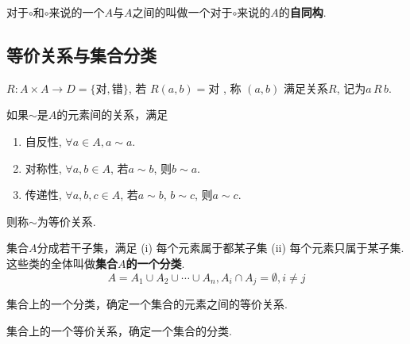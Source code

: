 \begin{Definition}[自同构]
对于$\circ$和$\circ$来说的一个$A$与$A$之间的\;\;叫做一个对于$\circ$来说的$A$的\textbf{自同构}.
\end{Definition}

\subsection{等价关系与集合分类}

\begin{Definition}[关系\mbox{[Relation]}]
$R: A \times A \rightarrow D = \{\text{对}, \text{错}\} $, 
若
$R(a, b) = \text{对}$
, 称
$(a, b)$
满足关系$R$, 记为$a \, R \, b$.
\end{Definition}

\begin{Definition}[等价关系]
如果$\sim$是$A$的元素间的关系，满足 
\begin{enumerate}[(1)]
\item 自反性, $\forall a \in A, a \sim a$.
\item 对称性, $\forall a, b \in A$, 若$a \sim b$, 则$b \sim a$.
\item 传递性, $\forall a, b, c \in A$, 若$a \sim b$, $b\sim c$, 则$a \sim c$.
\end{enumerate}
则称$\sim$为等价关系.
\end{Definition}

\begin{Definition}[集合分类、划分]
集合$A$分成若干子集，满足 (i) 每个元素属于都某子集 (ii) 每个元素只属于某子集. 这些类的全体叫做\textbf{集合$A$的一个分类}.
$$ A = A_1 \cup A_2 \cup \cdots \cup A_n, A_i \cap A_j = \emptyset, i \neq j$$
\end{Definition}

\begin{Theorem}
集合上的一个分类，确定一个集合的元素之间的等价关系.
\end{Theorem}

\begin{Theorem}
集合上的一个等价关系，确定一个集合的分类.
\end{Theorem}

\begin{Definition}
{}
\end{Definition}

